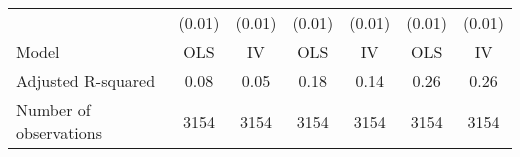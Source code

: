 \begin{tabular}{lllllll}
\multicolumn{1}{l}{} &
  \multicolumn{1}{c}{(0.01)} &
  \multicolumn{1}{c}{(0.01)} &
  \multicolumn{1}{c}{(0.01)} &
  \multicolumn{1}{c}{(0.01)} &
  \multicolumn{1}{c}{(0.01)} &
  \multicolumn{1}{c}{(0.01)} \\
\multicolumn{1}{l}{Model} &
  \multicolumn{1}{c}{OLS} &
  \multicolumn{1}{c}{IV} &
  \multicolumn{1}{c}{OLS} &
  \multicolumn{1}{c}{IV} &
  \multicolumn{1}{c}{OLS} &
  \multicolumn{1}{c}{IV} \\
\multicolumn{1}{l}{Adjusted R-squared} &
  \multicolumn{1}{c}{0.08} &
  \multicolumn{1}{c}{0.05} &
  \multicolumn{1}{c}{0.18} &
  \multicolumn{1}{c}{0.14} &
  \multicolumn{1}{c}{0.26} &
  \multicolumn{1}{c}{0.26} \\
\multicolumn{1}{l}{Number of observations} &
  \multicolumn{1}{c}{3154} &
  \multicolumn{1}{c}{3154} &
  \multicolumn{1}{c}{3154} &
  \multicolumn{1}{c}{3154} &
  \multicolumn{1}{c}{3154} &
  \multicolumn{1}{c}{3154} \\
\cline{1-7}
\end{tabular}
